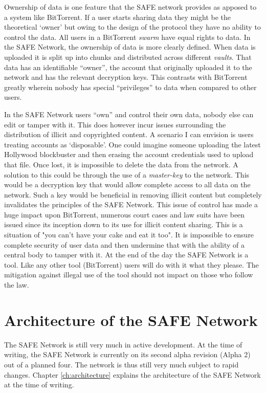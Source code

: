 Ownership of data is one feature that the SAFE network provides as apposed to a system like BitTorrent. If a user starts sharing data they might be the theoretical `owner' but owing to the design of the protocol they have no ability to control the data. All users in a BitTorrent \textit{swarm} have equal rights to data. In the SAFE Network, the ownership of data is more clearly defined. When data is uploaded it is split up into chunks and distributed across different \textit{vaults}. That data has an identifiable ``owner'', the account that originally uploaded it to the network and has the relevant decryption keys. This contrasts with BitTorrent greatly wherein nobody has special ``privileges'' to data when compared to other users.

In the SAFE Network users ``own'' and control their own data, nobody else can edit or tamper with it. This does however incur issues surrounding the distribution of illicit and copyrighted content. A scenario I can envision is users treating accounts as `disposable'. One could imagine someone uploading the latest Hollywood blockbuster and then erasing the account credentials used to upload that file. Once lost, it is impossible to delete the data from the network. A solution to this could be through the use of a \textit{master-key} to the network. This would be a decryption key that would allow complete access to all data on the network. Such a key would be beneficial in removing illicit content but completely invalidates the principles of the SAFE Network. This issue of control has made a huge impact upon BitTorrent, numerous court cases and law suits have been issued since its inception down to its use for illicit content sharing. This is a situation of "you can't have your cake and eat it too". It is impossible to ensure complete security of user data and then undermine that with the ability of a central body to tamper with it. At the end of the day the SAFE Network is a tool. Like any other tool (BitTorrent) users will do with it what they please. The mitigation against illegal use of the tool should not impact on those who follow the law.

\section{Architecture of the SAFE Network}

The SAFE Network is still very much in active development. At the time of writing, the SAFE Network is currently on its second alpha revision (Alpha 2) out of a planned four. The network is thus still very much subject to rapid changes. Chapter \ref{ch:architecture} explains the architecture of the SAFE Network at the time of writing.